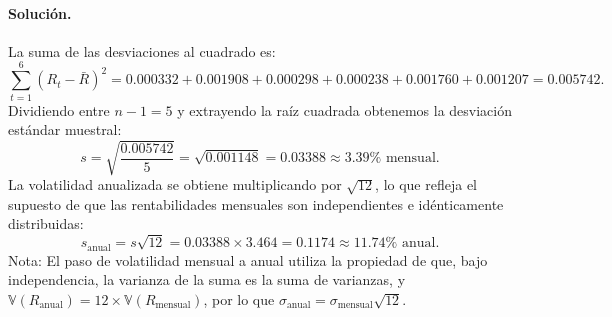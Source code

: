\documentclass[12pt,a4paper]{article}
\newcommand{\V}{\mathbb{V}}
\newenvironment{ejercicio}[1]{\subsection*{Ejercicio #1}}{}
\newenvironment{solucion}{\paragraph{Solución.}}{}
\begin{document}
\begin{solucion}
\begin{enumerate}[label=\alph*)]
  La suma de las desviaciones al cuadrado es:
  \[
  \sum_{t=1}^6 (R_t - \bar{R})^2 = 0.000332 + 0.001908 + 0.000298 + 0.000238 + 0.001760 + 0.001207 = 0.005742.
  \]
  Dividiendo entre $n-1=5$ y extrayendo la raíz cuadrada obtenemos la desviación estándar muestral:
  \[
  s = \sqrt{\frac{0.005742}{5}} = \sqrt{0.001148} = 0.03388 \approx 3.39\%\text{ mensual}.
  \]
  La volatilidad anualizada se obtiene multiplicando por $\sqrt{12}$, lo que refleja el supuesto de que las rentabilidades mensuales son independientes e idénticamente distribuidas:
  \[
  s_{\text{anual}} = s\sqrt{12} = 0.03388 \times 3.464 = 0.1174 \approx 11.74\%\text{ anual}.
  \]
  Nota: El paso de volatilidad mensual a anual utiliza la propiedad de que, bajo independencia, la varianza de la suma es la suma de varianzas, y $\V(R_{\text{anual}}) = 12 \times \V(R_{\text{mensual}})$, por lo que $\sigma_{\text{anual}} = \sigma_{\text{mensual}} \sqrt{12}$.
\end{enumerate}
\end{solucion}

\end{document}
